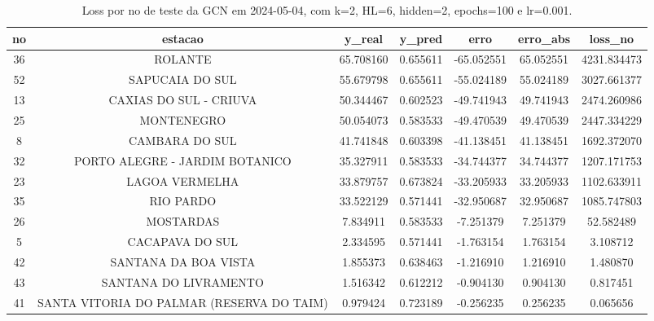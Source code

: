 \begin{table}[h]
\centering
\caption{Loss por no de teste da GCN em 2024-05-04, com k=2, HL=6, hidden=2, epochs=100 e lr=0.001.}
\label{tab:gcn_loss_k2_hl6_h2_e100_d20240504}
\begin{tabular}{ccccccc}
\toprule
no & estacao & y\_real & y\_pred & erro & erro\_abs & loss\_no \\
\midrule
36 & ROLANTE & 65.708160 & 0.655611 & -65.052551 & 65.052551 & 4231.834473 \\
52 & SAPUCAIA DO SUL & 55.679798 & 0.655611 & -55.024189 & 55.024189 & 3027.661377 \\
13 & CAXIAS DO SUL - CRIUVA & 50.344467 & 0.602523 & -49.741943 & 49.741943 & 2474.260986 \\
25 & MONTENEGRO & 50.054073 & 0.583533 & -49.470539 & 49.470539 & 2447.334229 \\
8 & CAMBARA DO SUL & 41.741848 & 0.603398 & -41.138451 & 41.138451 & 1692.372070 \\
32 & PORTO ALEGRE - JARDIM BOTANICO & 35.327911 & 0.583533 & -34.744377 & 34.744377 & 1207.171753 \\
23 & LAGOA VERMELHA & 33.879757 & 0.673824 & -33.205933 & 33.205933 & 1102.633911 \\
35 & RIO PARDO & 33.522129 & 0.571441 & -32.950687 & 32.950687 & 1085.747803 \\
26 & MOSTARDAS & 7.834911 & 0.583533 & -7.251379 & 7.251379 & 52.582489 \\
5 & CACAPAVA DO SUL & 2.334595 & 0.571441 & -1.763154 & 1.763154 & 3.108712 \\
42 & SANTANA DA BOA VISTA & 1.855373 & 0.638463 & -1.216910 & 1.216910 & 1.480870 \\
43 & SANTANA DO LIVRAMENTO & 1.516342 & 0.612212 & -0.904130 & 0.904130 & 0.817451 \\
41 & SANTA VITORIA DO PALMAR (RESERVA DO TAIM) & 0.979424 & 0.723189 & -0.256235 & 0.256235 & 0.065656 \\
\bottomrule
\end{tabular}
\end{table}
